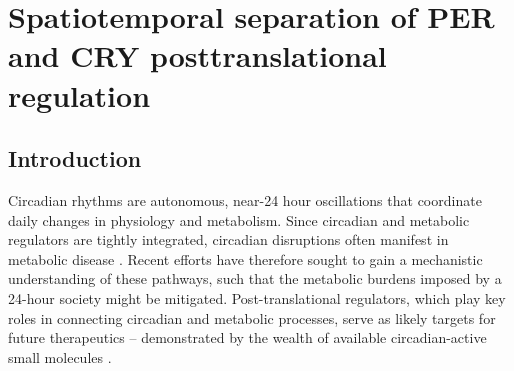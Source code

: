\chapter{Spatiotemporal separation of PER and CRY posttranslational regulation}


\section{Introduction}
Circadian rhythms are autonomous, near-24 hour oscillations that
coordinate daily changes in physiology and metabolism. Since circadian and
metabolic regulators are tightly integrated, circadian disruptions often
manifest in metabolic disease \cite{Bass2012}. Recent efforts have therefore
sought to gain a mechanistic understanding of these pathways, such that the
metabolic burdens imposed by a 24-hour society might be mitigated.
Post-translational regulators, which play key roles in connecting circadian and
metabolic processes, serve as likely targets for future therapeutics --
demonstrated by the wealth of available circadian-active small molecules
\cite{Chen2013}.

